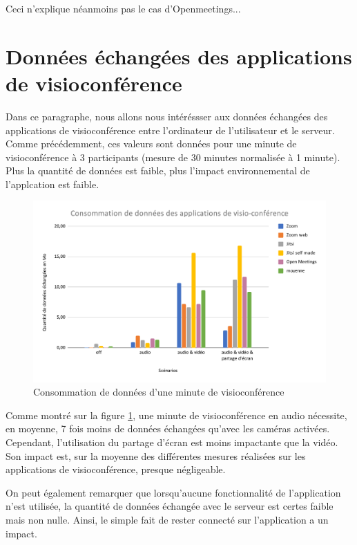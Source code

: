 \documentclass[11pt,a4paper]{report}
\begin{document}
\noindent Ceci n'explique néanmoins pas le cas d'Openmeetings... \eb 

\section{Données échangées des applications de visioconférence}

Dans ce paragraphe, nous allons nous intéréssser aux données échangées des applications de visioconférence entre l'ordinateur de l'utilisateur et le serveur. Comme précédemment, ces valeurs sont données pour une minute de visioconférence à 3 participants (mesure de 30 minutes normalisée à 1 minute). Plus la quantité de données est faible, plus l'impact environnemental de l'applcation est faible.

\begin{figure}[h]
  \centering
  \includegraphics[width=1\linewidth]{graph_donnees.pdf}
  \caption{Consommation de données d'une minute de visioconférence}
  \label{fig:graph_donne}
\end{figure}

Comme montré sur la figure \ref{fig:graph_donne}, une minute de visioconférence en audio nécessite, en moyenne, 7 fois moins de données échangées qu’avec les caméras activées. Cependant, l'utilisation du partage d'écran est moins impactante que la vidéo. Son impact est, sur la moyenne des différentes mesures réalisées sur les applications de visioconférence, presque négligeable.

On peut également remarquer que lorsqu'aucune fonctionnalité de l'application n'est utilisée, la quantité de données échangée avec le serveur est certes faible mais non nulle. Ainsi, le simple fait de rester connecté sur l'application a un impact. 
\end{document}

